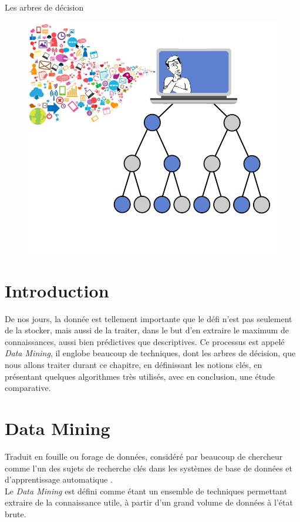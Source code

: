 \documentclass[a4paper, 11pt]{report}
\begin{document}
\begin{chapter}{Les arbres de décision}

\begin{figure}[h!]
\begin{center}
	\includegraphics[scale=0.6]{Images/intro3}
\end{center}
\end{figure}






\newpage
\tableofcontents
\newpage
\section{Introduction}
De nos jours, la donnée est tellement importante que le défi n'est pas seulement de la stocker, mais aussi de la traiter, dans le but d'en extraire le maximum de connaissances, aussi bien prédictives que descriptives. Ce processus est appelé \emph{Data Mining}, il englobe beaucoup de techniques, dont les arbres de décision, que nous allons traiter durant ce chapitre, en définissant les notions clés, en présentant quelques algorithmes très utilisés, avec en conclusion, une étude comparative.
\section{Data Mining}
Traduit en fouille ou forage de données, considéré par beaucoup de chercheur comme l’un des sujets de recherche clés dans les systèmes de base de données et d’apprentissage automatique \cite{553155}. 
\\Le \emph{Data Mining} est défini comme étant un ensemble de techniques permettant extraire de la connaissance utile, à partir d'un grand volume de données à l'état brute. 


\end{chapter}
\end{document}
